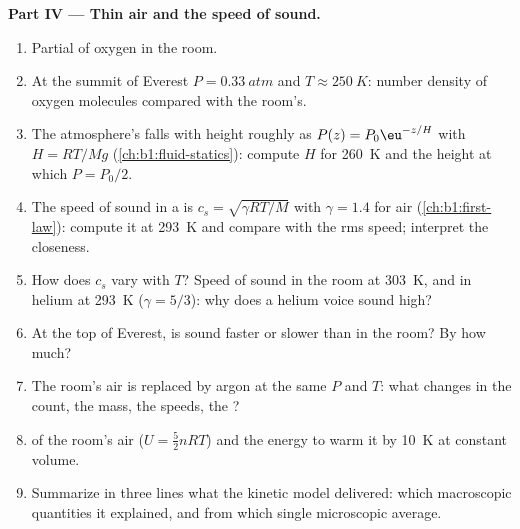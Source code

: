 \begin{problem}
\medskip
\noindent\textbf{Part IV --- Thin air and the speed of sound.}
\begin{enumerate}[resume]
  \item Partial  of oxygen in the room.
  \item At the summit of Everest $P = \qty{0.33}{atm}$ and $T \approx \qty{250}{K}$:
        number density of oxygen molecules compared with the room's.
  \item The atmosphere's  falls with height roughly as
        $P(z) = P_0\eu^{-z/H}$ with $H = RT/Mg$ (\cref{ch:b1:fluid-statics}):
        compute $H$ for \qty{260}{K} and the height at which $P = P_0/2$.
  \item The speed of sound in a  is $c_s = \sqrt{\gamma RT/M}$
        with $\gamma = 1.4$ for air (\cref{ch:b1:first-law}): compute it at
        \qty{293}{K} and compare with the rms speed; interpret the
        closeness.
  \item How does $c_s$ vary with $T$? Speed of sound in the room at
        \qty{303}{K}, and in helium at \qty{293}{K} ($\gamma = 5/3$): why
        does a helium voice sound high?
  \item At the top of Everest, is sound faster or slower than in the
        room? By how much?
  \item The room's air is replaced by argon at the same $P$ and $T$:
        what changes in the count, the mass, the speeds, the ?
  \item {} of the room's air ($U = \tfrac52 nRT$) and the
        energy to warm it by \qty{10}{K} at constant volume.
  \item Summarize in three lines what the kinetic model delivered: which
        macroscopic quantities it explained, and from which single
        microscopic average.
\end{enumerate}
\end{problem}
